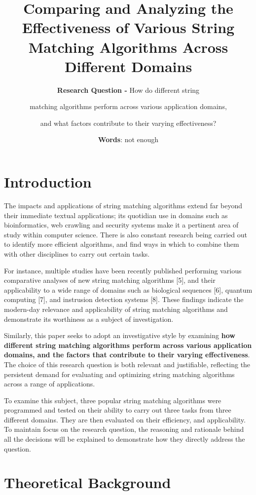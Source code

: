 \documentclass[12pt]{article}
\title{\textbf{Comparing and Analyzing the Effectiveness of Various String Matching Algorithms Across Different Domains}} %
\author{\textbf{Research Question -} How do different string \and matching algorithms perform across various application domains, \and and what factors contribute to their varying effectiveness?} %
\date{\textbf{Words}: not enough} %
\begin{document}
\doublespacing

\maketitle %
\thispagestyle{empty}
\pagebreak
\tableofcontents
\thispagestyle{empty}

\clearpage
{}

\pagebreak
\section{Introduction} %

The impacts and applications of string matching algorithms extend far beyond their immediate textual applications; its quotidian use in domains such as bioinformatics, web crawling and security systems make it a pertinent area of study within computer science. There is also constant research being carried out to identify more efficient algorithms, and find ways in which to combine them with other disciplines to carry out certain tasks.

For instance, multiple studies have been recently published performing various comparative analyses of new string matching algorithms [5], and their applicability to a wide range of domains such as biological sequences [6], quantum computing [7], and instrusion detection systems [8]. These findings indicate the modern-day relevance and applicability of string matching algorithms and demonstrate its worthiness as a subject of investigation.

Similarly, this paper seeks to adopt an investigative style by examining \textbf{how different string matching algorithms perform across various application domains, and the factors that contribute to their varying effectiveness}. The choice of this research question is both relevant and justifiable, reflecting the persistent demand for evaluating and optimizing string matching algorithms across a range of applications.

To examine this subject, three popular string matching algorithms were programmed and tested on their ability to carry out three tasks from three different domains. They are then evaluated on their efficiency, and applicability. To maintain focus on the research question, the reasoning and rationale behind all the decisions will be explained to demonstrate how they directly address the question.

\section{Theoretical Background} %
\end{document}
